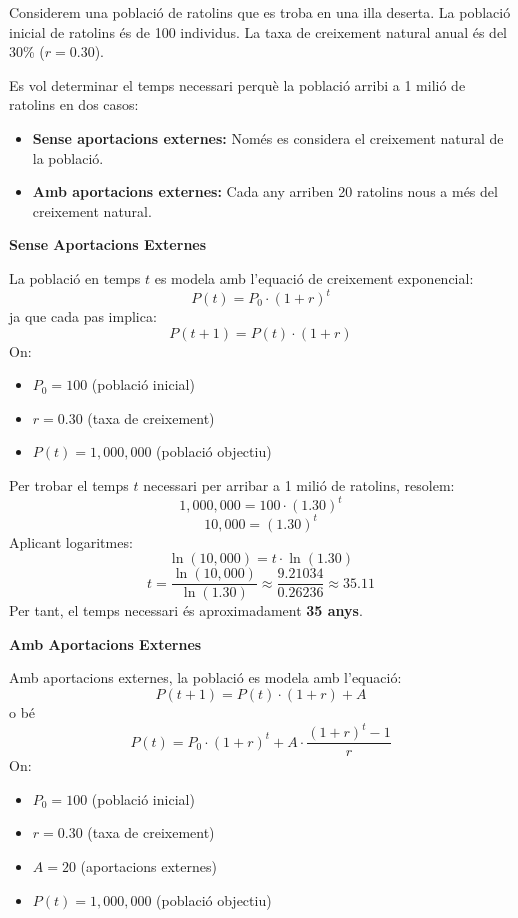\Exercise  
Considerem una població de ratolins que es troba en una illa deserta. La població inicial de ratolins és de 100 individus. La taxa de creixement natural anual és del 30\% ($r = 0.30$). 

Es vol determinar el temps necessari perquè la població arribi a 1 milió de ratolins en dos casos:

\begin{itemize}
    \item \textbf{Sense aportacions externes:} Només es considera el creixement natural de la població.
    \item \textbf{Amb aportacions externes:} Cada any arriben 20 ratolins nous a més del creixement natural.
\end{itemize}


\Answer


\textbf{Sense Aportacions Externes}

La població en temps $t$ es modela amb l'equació de creixement exponencial:
\[
P(t) = P_0 \cdot (1 + r)^t
\]
ja que cada pas implica:
\[
P(t+1) = P(t) \cdot (1 + r)
\]
On:
\begin{itemize}
    \item $P_0 = 100$ (població inicial)
    \item $r = 0.30$ (taxa de creixement)
    \item $P(t) = 1{,}000{,}000$ (població objectiu)
\end{itemize}

Per trobar el temps $t$ necessari per arribar a 1 milió de ratolins, resolem:
\[
1{,}000{,}000 = 100 \cdot (1.30)^t
\]
\[
10{,}000 = (1.30)^t
\]
Aplicant logaritmes:
\[
\ln(10{,}000) = t \cdot \ln(1.30)
\]
\[
t = \frac{\ln(10{,}000)}{\ln(1.30)} \approx \frac{9.21034}{0.26236} \approx 35.11
\]
Per tant, el temps necessari és aproximadament \textbf{35 anys}.

\textbf{Amb Aportacions Externes}

Amb aportacions externes, la població es modela amb l'equació:
\[
P(t+1) = P(t) \cdot (1 + r) + A
\]
o bé
\[
P(t) = P_0 \cdot (1 + r)^t + A \cdot \frac{(1 + r)^t - 1}{r}
\]
On:
\begin{itemize}
    \item $P_0 = 100$ (població inicial)
    \item $r = 0.30$ (taxa de creixement)
    \item $A = 20$ (aportacions externes)
    \item $P(t) = 1{,}000{,}000$ (població objectiu)
\end{itemize}

